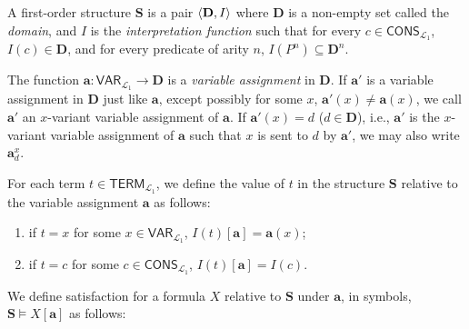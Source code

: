\begin{defn}
A first-order structure $\mathbf{S}$ is a pair $\langle\mathbf{D}, I\rangle$ where $\mathbf{D}$ is a non-empty set called the \textit{domain}, and $I$ is the \textit{interpretation function} such that for every $c \in \mathsf{CONS}_{\mathcal{L}_1}$, $I(c) \in \mathbf{D}$, and for every predicate of arity $n$, $I(P^n) \subseteq \mathbf{D}^n$.

The function $\mathbf{a}: \textsf{VAR}_{\mathcal{L}_1} \to \mathbf{D}$ is a \textit{variable assignment} in $\mathbf{D}$. If $\mathbf{a}'$ is a variable assignment in $\mathbf{D}$ just like $\mathbf{a}$, except possibly for some $x$, $\mathbf{a}'(x)\neq \mathbf{a}(x)$, we call $\mathbf{a}'$ an $x$-variant variable assignment of $\mathbf{a}$. If $\mathbf{a}'(x)=d$ ($d \in \mathbf{D}$), i.e., $\mathbf{a}'$ is the $x$-variant variable assignment of $\mathbf{a}$ such that $x$ is sent to $d$ by $\mathbf{a}'$, we may also write $\mathbf{a}^x_d$.

For each term $t \in \mathsf{TERM}_{\mathcal{L}_1}$, we define the value of $t$ in the structure $\mathbf{S}$ relative to the variable assignment $\mathbf{a}$ as follows:
\begin{enumerate}
	\item if $t=x$ for some $x \in \textsf{VAR}_{\mathcal{L}_1}$, $I(t)[\mathbf{a}]=\mathbf{a}(x)$;
	\item if $t=c$ for some $c \in \textsf{CONS}_{\mathcal{L}_1}$, $I(t)[\mathbf{a}]=I(c)$.
\end{enumerate}

We define satisfaction for a formula $X$ relative to $\mathbf{S}$ under $\mathbf{a}$, in symbols, $\mathbf{S} \models X[\mathbf{a}]$ as follows:


\end{defn}
